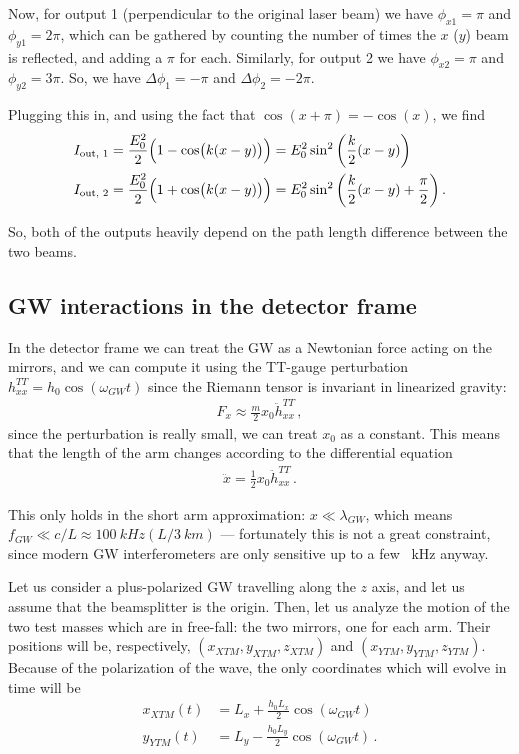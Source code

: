 \documentclass[main.tex]{subfiles}
\begin{document}
Now, for output 1 (perpendicular to the original laser beam) we have \(\phi_{x1} = \pi \) and \(\phi_{y1} = 2\pi \), which can be gathered by counting the number of times the \(x\) (\(y\)) beam is reflected, and adding a \(\pi \) for each. 
Similarly, for output 2 we have \(\phi_{x2} = \pi \) and \(\phi_{y2} = 3 \pi \). 
So, we have \(\Delta \phi_{1} = -\pi \) and \(\Delta \phi_{2} = - 2 \pi \). 

Plugging this in, and using the fact that \(\cos(x + \pi ) = - \cos(x)\), we find 
%
\begin{align}
I _{\text{out, 1}} &= \frac{E_0^2}{2} \qty(1 - \cos(k(x-y))) = E_0^2 \sin^2 \qty(\frac{k}{2} (x-y)) \\
I _{\text{out, 2}} &= \frac{E_0^2}{2} \qty(1 + \cos(k(x-y))) 
= E_0^2 \sin^2 \qty(\frac{k}{2} (x-y) + \frac{\pi}{2})
\,.
\end{align}

So, both of the outputs heavily depend on the path length difference between the two beams. 

\subsection{GW interactions in the detector frame}

In the detector frame we can treat the GW as a Newtonian force acting on the mirrors, and we can compute it using the TT-gauge perturbation \(h_{xx}^{TT} = h_0 \cos(\omega_{GW}t)\) since the Riemann tensor is invariant in linearized gravity:
%
\begin{align}
F_{x} \approx \frac{m}{2} x_0 \ddot{h}_{xx}^{TT} 
\,,
\end{align}
%
since the perturbation is really small, we can treat \(x_0 \) as a constant.
This means that the length of the arm changes according to the differential equation
%
\begin{align}
\ddot{x} = \frac{1}{2} x_0 \ddot{h}^{TT}_{xx}
\,.
\end{align}

This only holds in the short arm approximation: \(x \ll \lambda_{GW}\), which means \(f_{GW} \ll c/ L  \approx \SI{100}{kHz} (L / \SI{3}{km} )\) --- fortunately this is not a great constraint, since modern GW interferometers are only sensitive up to a few \SI{}{kHz} anyway. 

Let us consider a plus-polarized GW travelling along the \(z\) axis, and let us assume that the beamsplitter is the origin. 
Then, let us analyze the motion of the two test masses which are in free-fall: the two mirrors, one for each arm. Their positions will be, respectively, \((x_{XTM}, y_{XTM}, z_{XTM})\) and \((x_{YTM}, y_{YTM}, z_{YTM})\). Because of the polarization of the wave, the only coordinates which will evolve in time will be 
%
\begin{align}
x_{XTM} (t ) &= L_x + \frac{h_0 L_x}{2} \cos(\omega_{GW} t) \\
y_{YTM} (t ) &= L_y - \frac{h_0 L_y}{2} \cos(\omega_{GW} t)
\,.
\end{align}
%
\end{document}
